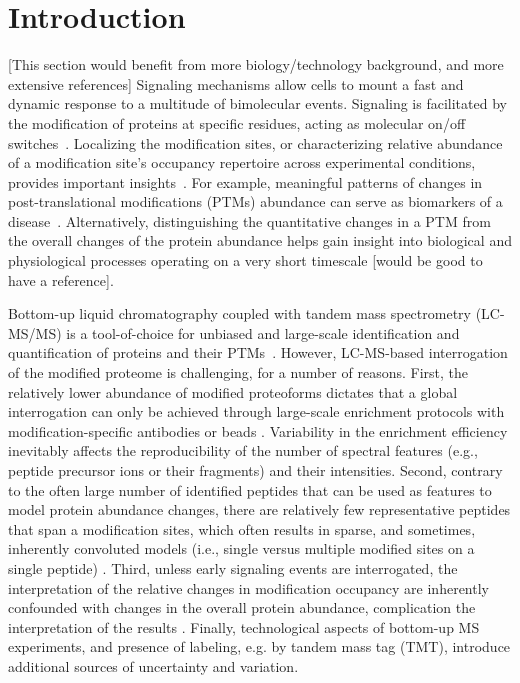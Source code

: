 \documentclass[mcp]{article}
\numberwithin{table}{section}
\def\todo#1{{\color{red}[#1]}}
\begin{document}
\section{Introduction}

\todo{This section would benefit from more biology/technology background, and more extensive references}
Signaling mechanisms allow cells to mount a fast and dynamic response to a multitude of bimolecular events. Signaling is facilitated by the modification of proteins at specific residues, acting as molecular on/off switches~\cite{Deribe,Cohen}. Localizing the modification sites, or characterizing relative abundance of a modification site's occupancy repertoire across experimental conditions, provides important insights~\cite{Mann}. For example, meaningful patterns of changes in post-translational modifications (PTMs) abundance can serve as biomarkers of a disease~\cite{Petushkova_2017}. Alternatively, distinguishing the quantitative changes in a PTM from the overall changes of the protein abundance helps gain insight into biological and physiological processes operating on a very short timescale \todo{would be good to have a reference}.

Bottom-up liquid chromatography coupled with tandem mass spectrometry (LC-MS/MS) is a tool-of-choice for unbiased and large-scale identification and quantification of proteins and their PTMs~\cite{Kall:2011ub,Roepstorff}. However, LC-MS-based interrogation of the modified proteome is challenging, for a number of reasons. First, the relatively lower abundance of modified proteoforms dictates that a global interrogation can only be achieved through large-scale enrichment protocols with modification-specific antibodies or beads \cite{Huang:2014}. Variability in the enrichment efficiency inevitably affects the reproducibility of the number of spectral features (e.g., peptide precursor ions or their fragments) and their intensities. Second, contrary to the often large number of identified peptides that can be used as features to model protein abundance changes, there are relatively few representative peptides that span a modification sites, which often results in sparse, and sometimes, inherently convoluted models (i.e., single versus multiple modified sites on a single peptide) \cite{Mann}. Third, unless early signaling events are interrogated, the interpretation of the relative changes in modification occupancy are inherently confounded with changes in the overall protein abundance, complication the interpretation of the results \cite{Olsen:2013}. Finally, technological aspects of bottom-up MS experiments, and presence of labeling, e.g. by tandem mass tag (TMT), introduce additional sources of uncertainty and variation.
\end{document}
